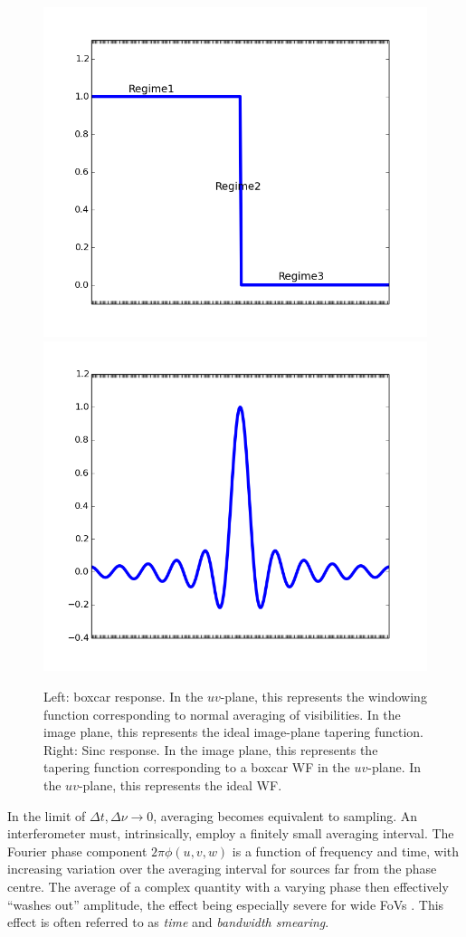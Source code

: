 \documentclass[useAMS,usenatbib]{mn2e}
\begin{document}
\begin{figure}
\includegraphics[width=.5\textwidth]{./Figures/idealIPR.png}%
\includegraphics[width=.5\textwidth]{./Figures/idealsinc.png}\\
\caption{Left: boxcar response. In the $uv$-plane, this represents the windowing function corresponding to normal
averaging of visibilities. In the image plane, this represents the ideal image-plane tapering function. Right: 
Sinc response. In the image plane, this represents the tapering function corresponding to a boxcar WF in 
the $uv$-plane. In the $uv$-plane, this represents the ideal WF.}
\label{fig:idealWF}
\end{figure}

In the limit of $\Delta t,\Delta \nu \rightarrow 0$, averaging becomes equivalent to sampling. 
An interferometer must, intrinsically, employ a finitely small averaging interval. The Fourier phase 
component $2\pi\phi(u,v,w)$ is a function of frequency and time, with increasing variation over the averaging interval 
for sources far from the phase centre. The average of a complex quantity with a varying phase then effectively ``washes out'' 
amplitude, the effect being especially severe for wide FoVs \citep[for an extensive discussion, see][]{bregman2012system}. This
effect is often referred to as \emph{time} and \emph{bandwidth smearing}.
\end{document}

